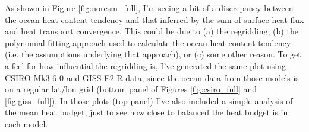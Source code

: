 As shown in Figure \ref{fig:noresm_full}, I'm seeing a bit of a discrepancy between the ocean heat content tendency and that inferred by the sum of surface heat flux and heat transport convergence. This could be due to (a) the regridding, (b) the polynomial fitting approach used to calculate the ocean heat content tendency (i.e. the assumptions underlying that approach), or (c) some other reason. To get a feel for how influential the regridding is, I've generated the same plot using CSIRO-Mk3-6-0 and GISS-E2-R data, since the ocean data from those models is on a regular lat/lon grid (bottom panel of Figures \ref{fig:csiro_full} and \ref{fig:giss_full}). In those plots (top panel) I've also included a simple analysis of the mean heat budget, just to see how close to balanced the heat budget is in each model.